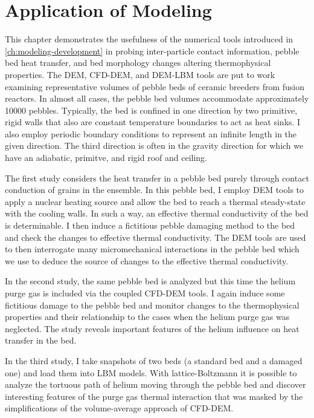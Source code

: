 \chapter{Application of Modeling}\label{sec:dem-studies}

This chapter demonstrates the usefulness of the numerical tools introduced in \cref{ch:modeling-development} in probing inter-particle contact information, pebble bed heat transfer, and bed morphology changes altering thermophysical properties. The DEM, CFD-DEM, and DEM-LBM tools are put to work examining representative volumes of pebble beds of ceramic breeders from fusion reactors. In almost all cases, the pebble bed volumes accommodate approximately \num{10000} pebbles. Typically, the bed is confined in one direction by two primitive, rigid walls that also are constant temperature boundaries to act as heat sinks. I also employ periodic boundary conditions to represent an infinite length in the given direction. The third direction is often in the gravity direction for which we have an adiabatic, primitve, and rigid roof and ceiling.

The first study considers the heat transfer in a pebble bed purely through contact conduction of grains in the ensemble. In this pebble bed, I employ DEM tools to apply a nuclear heating source and allow the bed to reach a thermal steady-state with the cooling walls. In such a way, an effective thermal conductivity of the bed is determinable. I then induce a fictitious pebble damaging method to the bed and check the changes to effective thermal conductivity. The DEM tools are used to then interrogate many micromechanical interactions in the pebble bed which we use to deduce the source of changes to the effective thermal conductivity.

In the second study, the same pebble bed is analyzed but this time the helium purge gas is included via the coupled CFD-DEM tools. I again induce some fictitious damage to the pebble bed and monitor changes to the thermophysical properties and their relationship to the cases when the helium purge gas was neglected. The study reveals important features of the helium influence on heat transfer in the bed.

In the third study, I take snapshots of two beds (a standard bed and a damaged one) and load them into LBM models. With lattice-Boltzmann it is possible to analyze the tortuous path of helium moving through the pebble bed and discover interesting features of the purge gas thermal interaction that was masked by the simplifications of the volume-average approach of CFD-DEM.



























